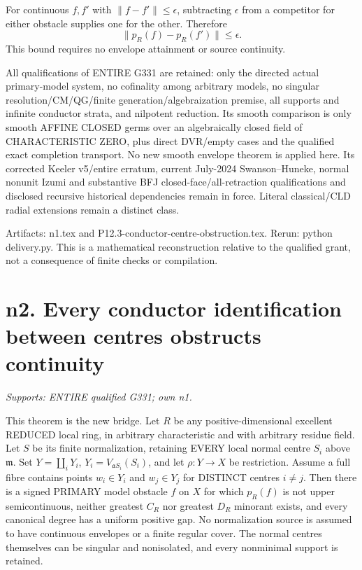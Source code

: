 \documentclass[11pt]{article}
\begin{document}
For continuous $f,f'$ with $\|f-f'\|\le\epsilon$, subtracting $\epsilon$
from a competitor for either obstacle supplies one for the other. Therefore
\[
                  \|p_R(f)-p_R(f')\|\le\epsilon.          \tag{3}
\]
This bound requires no envelope attainment or source continuity.

All qualifications of ENTIRE G331 are retained: only the directed actual
primary-model system, no cofinality among arbitrary models, no singular
resolution/CM/QG/finite generation/algebraization premise, all supports and
infinite conductor strata, and nilpotent reduction. Its smooth comparison
is only smooth AFFINE CLOSED germs over an algebraically closed field of
CHARACTERISTIC ZERO, plus direct DVR/empty cases and the qualified exact
completion transport. No new smooth envelope theorem is applied here.
Its corrected Keeler v5/entire erratum, current July-2024 Swanson--Huneke,
normal nonunit Izumi and substantive BFJ closed-face/all-retraction
qualifications and disclosed recursive historical dependencies remain in
force. Literal classical/CLD radial extensions remain a distinct class.

Artifacts: n1.tex and P12.3-conductor-centre-obstruction.tex. Rerun:
python delivery.py. This is a mathematical reconstruction relative to the
qualified grant, not a consequence of finite checks or compilation.

\section{n2. Every conductor identification between centres obstructs continuity}
\textit{Supports: ENTIRE qualified G331; own n1.}

This theorem is the new bridge. Let $R$ be any positive-dimensional
excellent REDUCED local ring, in arbitrary characteristic and with arbitrary
residue field. Let $S$ be its finite normalization, retaining EVERY local
normal centre $S_i$ above $\mathfrak m$. Set
$Y=\coprod_iY_i$, $Y_i=V_{\mathfrak aS_i}(S_i)$, and let
$\rho:Y\to X$ be restriction. Assume a full fibre contains points
$w_i\in Y_i$ and $w_j\in Y_j$ for DISTINCT centres $i\ne j$.
Then there is a signed PRIMARY model obstacle $f$ on $X$ for which
$p_R(f)$ is not upper semicontinuous, neither greatest $C_R$ nor greatest
$D_R$ minorant exists, and every canonical degree has a uniform positive
gap. No normalization source is assumed to have continuous envelopes or a
finite regular cover. The normal centres themselves can be singular and
nonisolated, and every nonminimal support is retained.
\end{document}
